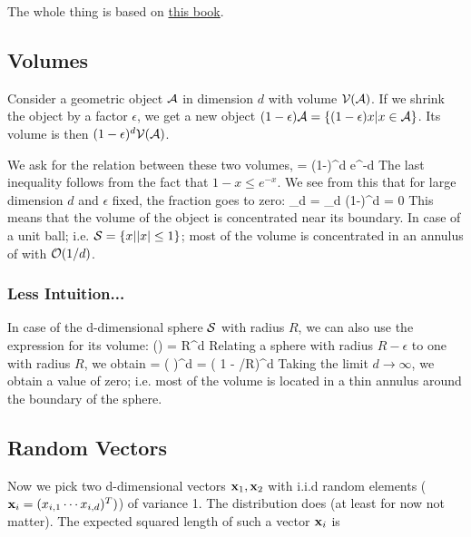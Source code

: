 
The whole thing is based on \href{https://www.cs.cornell.edu/jeh/book2016June9.pdf}{this book}.

\subsection{Volumes}

Consider a geometric object $\mathcal{A}$ in dimension $d$ with volume $\mathcal{V}(\mathcal{A})$. If we shrink the object by a factor $\epsilon$, we get a new object $(1-\epsilon)\mathcal{A} = \{(1-\epsilon)x | x \in \mathcal{A}\}$. Its volume is then $(1-\epsilon)^d\mathcal{V}(\mathcal{A})$.

We ask for the relation between these two volumes,
%
\bee
{} = (1-\epsilon)^d \leq e^{-\epsilon d}
\eee
%
The last inequality follows from the fact that $1-x \leq e^{-x}$. We see from this that for large dimension $d$ and $\epsilon$ fixed, the fraction goes to zero:
%
\bee
\lim_{d \rightarrow \infty}  = \lim_{d \rightarrow \infty} (1-\epsilon)^d = 0
\eee
%
This means that the volume of the object is concentrated near its boundary. In case of a unit ball; i.e. $\mathcal{S} = \{x | |x| \leq 1 \}$; most of the volume is concentrated in an annulus of with $\mathcal{O}(1/d)$.


\subsubsection{Less Intuition...}

In case of the d-dimensional sphere $\mathcal{S}$ with radius $R$, we can also use the expression for its volume:
%
\bee
\Vc(\Sc) =  R^d
\eee
%
Relating a sphere with radius $R-\epsilon$ to one with radius $R$, we obtain
%
\bee
{} = \left( \right)^d = \left( 1 - \epsilon/R\right)^d
\eee
%
Taking the limit $d \rightarrow \infty$, we obtain a value of zero; i.e. most of the volume is located in a thin annulus around the boundary of the sphere.

\subsection{Random Vectors}

Now we pick two d-dimensional vectors $\mathbf{x}_1, \mathbf{x}_2$ with i.i.d random elements ($\mathbf{x}_i = (x_{i,1} \cdots x_{i,d})^T)$) of variance 1. The distribution does (at least for now not matter). The expected squared length of such a vector $\mathbf{x}_i$ is

